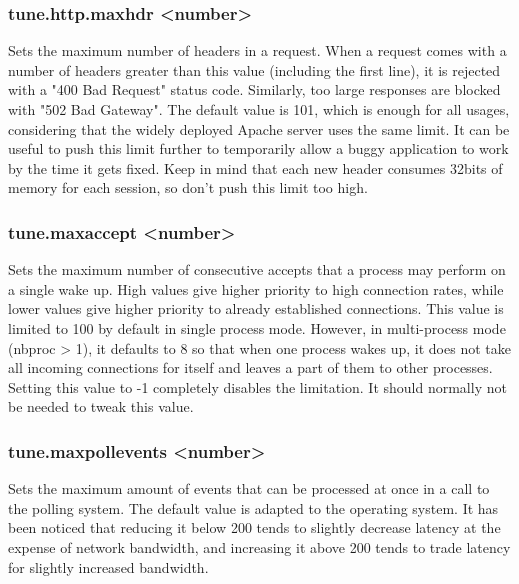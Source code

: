 \subsubsection[tune.http.maxhdr]{tune.http.maxhdr <number>}
  Sets the maximum number of headers in a request. When a request comes with a
  number of headers greater than this value (including the first line), it is
  rejected with a "400 Bad Request" status code. Similarly, too large responses
  are blocked with "502 Bad Gateway". The default value is 101, which is enough
  for all usages, considering that the widely deployed Apache server uses the
  same limit. It can be useful to push this limit further to temporarily allow
  a buggy application to work by the time it gets fixed. Keep in mind that each
  new header consumes 32bits of memory for each session, so don't push this
  limit too high.

\subsubsection[tune.maxaccept]{tune.maxaccept <number>}
  Sets the maximum number of consecutive accepts that a process may perform on
  a single wake up. High values give higher priority to high connection rates,
  while lower values give higher priority to already established connections.
  This value is limited to 100 by default in single process mode. However, in
  multi-process mode (nbproc > 1), it defaults to 8 so that when one process
  wakes up, it does not take all incoming connections for itself and leaves a
  part of them to other processes. Setting this value to -1 completely disables
  the limitation. It should normally not be needed to tweak this value.

\subsubsection[tune.maxpollevents]{tune.maxpollevents <number>}
  Sets the maximum amount of events that can be processed at once in a call to
  the polling system. The default value is adapted to the operating system. It
  has been noticed that reducing it below 200 tends to slightly decrease
  latency at the expense of network bandwidth, and increasing it above 200
  tends to trade latency for slightly increased bandwidth.

